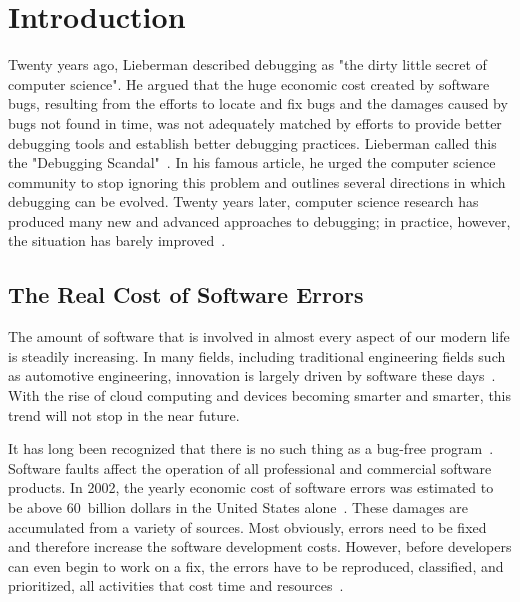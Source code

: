 \chapter{Introduction}
\label{sec:introduction}

Twenty years ago, Lieberman described debugging as "the dirty little secret of computer science".
He argued that the huge economic cost created by software bugs, resulting from the efforts to locate and fix bugs and the damages caused by bugs  not found in time, was not adequately matched by efforts to provide better debugging tools and establish better debugging practices.
Lieberman called this the "Debugging Scandal"~\cite{lieberman97:the_debugging_scandal}.
In his famous article, he urged the computer science community to stop ignoring this problem and outlines several directions in which debugging can be evolved.
Twenty years later, computer science research has produced many new and advanced approaches to debugging; in practice, however, the situation has barely improved~\cite{yin11:debugging_scandal_the_next}.

\section{The Real Cost of Software Errors}

The amount of software that is involved in almost every aspect of our modern life is steadily increasing.
In many fields, including traditional engineering fields such as automotive engineering, innovation is largely driven by software these days~\cite{evans08:invisible_engines_how_software, gorschek10:a_lightweight_innovation_process}.
With the rise of cloud computing and devices becoming smarter and smarter, this trend will not stop in the near future.


It has long been recognized that there is no such thing as a bug-free program~\cite{schwartz71:an_overview_of_bugs}.
Software faults affect the operation of all professional and commercial software products.
In 2002, the yearly economic cost of software errors was estimated to be above 60~billion dollars in the United States alone~\cite{tassey02:the_economic_impacts}. 
These damages are accumulated from a variety of sources.
Most obviously, errors need to be fixed and therefore increase the software development costs.
However, before developers can even begin to work on a fix, the errors have to be reproduced, classified, and prioritized, all activities that cost time and resources~\cite{sahoo10:an_empirical_study, guo10:characterizing_and_predicting_which}.

